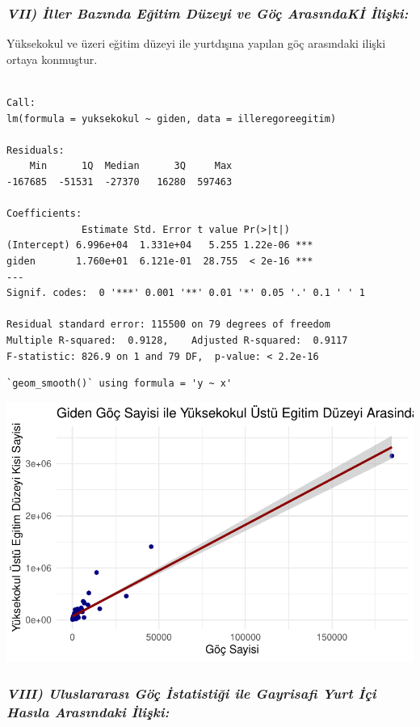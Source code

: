 \documentclass[
  11pt,
  a4paper,
  DIV=11,
  numbers=noendperiod]{scrartcl}
\begin{document}
\subsubsection{\texorpdfstring{\emph{VII) İller Bazında Eğitim Düzeyi ve
Göç ArasındaKİ
İlişki:}}{VII) İller Bazında Eğitim Düzeyi ve Göç ArasındaKİ İlişki:}}\label{vii-iller-bazux131nda-eux11fitim-duxfczeyi-ve-guxf6uxe7-arasux131ndaki-iliux15fki}

Yüksekokul ve üzeri eğitim düzeyi ile yurtdışına yapılan göç arasındaki
ilişki ortaya konmuştur.

\begin{verbatim}

Call:
lm(formula = yuksekokul ~ giden, data = illeregoreegitim)

Residuals:
    Min      1Q  Median      3Q     Max 
-167685  -51531  -27370   16280  597463 

Coefficients:
             Estimate Std. Error t value Pr(>|t|)    
(Intercept) 6.996e+04  1.331e+04   5.255 1.22e-06 ***
giden       1.760e+01  6.121e-01  28.755  < 2e-16 ***
---
Signif. codes:  0 '***' 0.001 '**' 0.01 '*' 0.05 '.' 0.1 ' ' 1

Residual standard error: 115500 on 79 degrees of freedom
Multiple R-squared:  0.9128,    Adjusted R-squared:  0.9117 
F-statistic: 826.9 on 1 and 79 DF,  p-value: < 2.2e-16
\end{verbatim}

\begin{verbatim}
`geom_smooth()` using formula = 'y ~ x'
\end{verbatim}

\includegraphics{project_files/figure-pdf/unnamed-chunk-9-1.pdf}

\subsubsection{\texorpdfstring{\emph{VIII) Uluslararası Göç İstatistiği
ile Gayrisafi Yurt İçi Hasıla Arasındaki
İlişki:}}{VIII) Uluslararası Göç İstatistiği ile Gayrisafi Yurt İçi Hasıla Arasındaki İlişki:}}\label{viii-uluslararasux131-guxf6uxe7-istatistiux11fi-ile-gayrisafi-yurt-iuxe7i-hasux131la-arasux131ndaki-iliux15fki}
\end{document}
